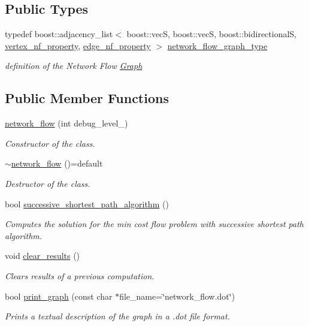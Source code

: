 \subsection*{Public Types}
\begin{DoxyCompactItemize}
\item 
typedef boost\+::adjacency\+\_\+list$<$ boost\+::vecS, boost\+::vecS, boost\+::bidirectionalS, \hyperlink{classnetwork__flow_ae9862e011ed505ae9795617b0725fa9e}{vertex\+\_\+nf\+\_\+property}, \hyperlink{classnetwork__flow_a09cdef033c08baeb9ef03c21f0a5947d}{edge\+\_\+nf\+\_\+property} $>$ \hyperlink{classnetwork__flow_abfdb8d1baba183c2b121f8c078b9b640}{network\+\_\+flow\+\_\+graph\+\_\+type}
\begin{DoxyCompactList}\small\item\em definition of the Network Flow \hyperlink{structGraph}{Graph} \end{DoxyCompactList}\end{DoxyCompactItemize}
\subsection*{Public Member Functions}
\begin{DoxyCompactItemize}
\item 
\hyperlink{classnetwork__flow_a3872d37640e79a5a7bdb865421f17eff}{network\+\_\+flow} (int debug\+\_\+level\+\_\+)
\begin{DoxyCompactList}\small\item\em Constructor of the class. \end{DoxyCompactList}\item 
\hyperlink{classnetwork__flow_a83ed613ca69ee8835a5823fc56195ddc}{$\sim$network\+\_\+flow} ()=default
\begin{DoxyCompactList}\small\item\em Destructor of the class. \end{DoxyCompactList}\item 
bool \hyperlink{classnetwork__flow_a69ab021e187be369fbf1e6c068942224}{successive\+\_\+shortest\+\_\+path\+\_\+algorithm} ()
\begin{DoxyCompactList}\small\item\em Computes the solution for the min cost flow problem with successive shortest path algorithm. \end{DoxyCompactList}\item 
void \hyperlink{classnetwork__flow_a7c6260f32d2ece0115ad0773348774b4}{clear\+\_\+results} ()
\begin{DoxyCompactList}\small\item\em Clears results of a previous computation. \end{DoxyCompactList}\item 
bool \hyperlink{classnetwork__flow_ac934a543bc088ad9768b9938b4f19145}{print\+\_\+graph} (const char $\ast$file\+\_\+name=\char`\"{}network\+\_\+flow.\+dot\char`\"{})
\begin{DoxyCompactList}\small\item\em Prints a textual description of the graph in a .dot file format. \end{DoxyCompactList}\end{DoxyCompactItemize}
